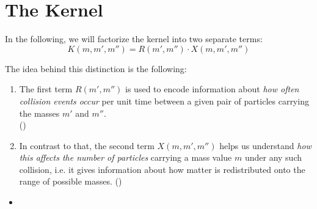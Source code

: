 
\clearpage\section{The Kernel}


    In the following, we will factorize the kernel into two separate terms:
    \begin{equation}
        K(m,m',m'') = R(m',m'') \cdot X(m,m',m'') 
    \end{equation}

    The idea behind this distinction is the following: 
    \begin{enumerate}
        \item The first term $R(m',m'')$ is used to encode information about 
            \textit{how often collision events occur} per unit time between a given
            pair of particles carrying the masses $m'$ and $m''$. \\
            ()
        \item In contrast to that, the second term $X(m,m',m'')$ helps us understand 
            \textit{how this affects the number of particles} carrying a mass value $m$ under any
            such collision, i.e. it gives information about how matter is redistributed onto the
            range of possible masses.
            ()
    \end{enumerate}


    \begin{itemize}
        \item {}
    \end{itemize}




